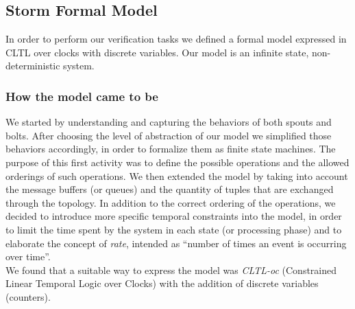 %


\subsection{Storm Formal Model}
In order to perform our verification tasks we defined a formal model expressed in CLTL over clocks with discrete variables.
Our model is an infinite state, non-deterministic system.

\subsubsection{How the model came to be}
We started by understanding and capturing the behaviors of both spouts and bolts. 
After choosing the level of abstraction of our model we simplified those behaviors accordingly, in order to formalize them as finite state machines. The purpose of this first activity was to define the possible operations and the allowed orderings of such operations.
We then extended the model by taking into account the message buffers (or queues) and the quantity of tuples that are exchanged through the topology.
In addition to the correct ordering of the operations, we decided to introduce more specific temporal constraints into the model, in order to limit the time spent by the system in each state (or processing phase) and to elaborate the concept of \textit{rate}, intended as ``number of times an event is occurring over time''.\\
We found that a suitable way to express the model was \textit{CLTL-oc} (Constrained Linear Temporal Logic over Clocks) with the addition of discrete variables (counters).\\




